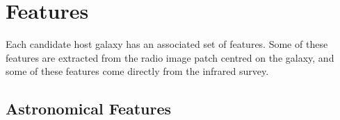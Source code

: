 


\section{Features}
\label{sec:features}

  Each candidate host galaxy has an associated set of features. Some of these features are extracted from the radio image patch centred on the galaxy, and some of these features come directly from the infrared survey.

  \subsection{Astronomical Features}

